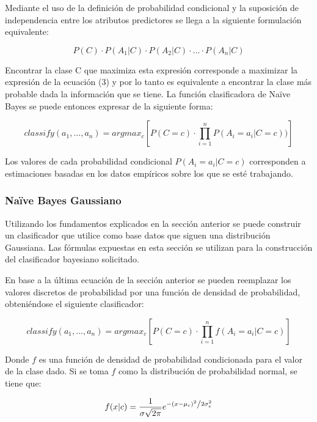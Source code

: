 \documentclass[letter, titlepage, 10pt]{article}
\begin{document}
Mediante el uso de la definición de probabilidad condicional y la suposición de independencia entre los atributos predictores se llega a la siguiente formulación equivalente:

\begin{equation}
P(C)\cdot P(A_1|C)\cdot P(A_2|C) \cdot...\cdot P(A_n|C)
\end{equation}

Encontrar la clase C que maximiza esta expresión corresponde a maximizar la expresión de la ecuación (3) y por lo tanto es equivalente a encontrar la clase más probable dada la información que se tiene.
La función clasificadora de Naïve Bayes se puede entonces expresar de la siguiente forma:

\begin{equation}
classify(a_1,...,a_n) = argmax_{c}\left[P(C = c)\cdot \prod\limits_{i=1}^n P(A_i = a_i|C = c))\right]
\end{equation}


Los valores de cada probabilidad condicional $P(A_i = a_i|C = c)$ corresponden a estimaciones basadas en los datos empíricos sobre los que se esté trabajando.

  \subsubsection{Naïve Bayes Gaussiano}
Utilizando los fundamentos explicados en la sección anterior se puede construir un clasificador que utilice como base datos que siguen una distribución Gaussiana. Las fórmulas expuestas en esta sección se utilizan para la construcción del clasificador bayesiano solicitado.

En base a la última ecuación de la sección anterior se pueden reemplazar los valores discretos de probabilidad por una función de densidad de probabilidad, obteniéndose el siguiente clasificador:

\begin{equation}
classify(a_1,...,a_n) = argmax_{c}\left[P(C = c)\cdot \prod\limits_{i=1}^n f(A_i = a_i|C = c)\right]
\end{equation}

Donde $f$ es una función de densidad de probabilidad condicionada para el valor de la clase dado. Si se toma $f$ como la distribución de probabilidad normal, se tiene que:

\begin{equation}
f(x|c) = \frac{1}{{\sigma \sqrt {2\pi } }}e^{{{ - \left( {x - \mu_c } \right)^2 } \mathord{\left/ {\vphantom {{ - \left( {x - \mu_c } \right)^2 } {2\sigma_c ^2 }}} \right. \kern-\nulldelimiterspace} {2\sigma_c ^2 }}}
\end{equation}
\end{document}
